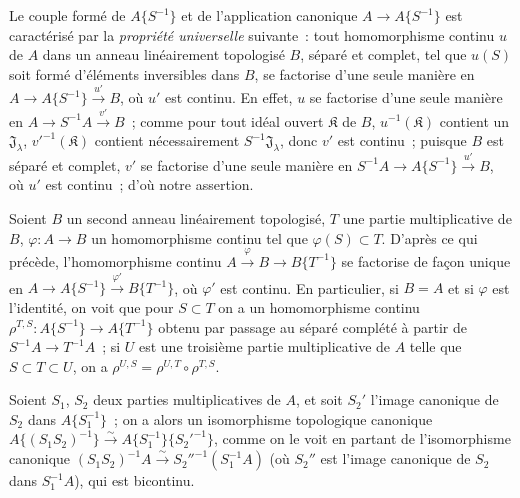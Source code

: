 \begin{env}[7.6.6]
\label{0.7.6.6-fr}
Le couple formé de $A\{S^{-1}\}$ et de l'application canonique
$A\to A\{S^{-1}\}$ est caractérisé par la \emph{propriété universelle}
suivante~: tout homomorphisme continu $u$ de $A$ dans un anneau linéairement
topologisé $B$, séparé et complet, tel que $u(S)$ soit formé d'éléments
inversibles dans $B$, se factorise d'une seule manière en
$A\to A\{S^{-1}\}\xrightarrow{u'}B$, où $u'$ est continu. En effet, $u$ se
factorise d'une seule manière en $A\to S^{-1}A\xrightarrow{v'}B$~; comme pour
tout idéal ouvert $\mathfrak K$ de $B$, $u^{-1}(\mathfrak K)$ contient un
$\mathfrak J_\lambda$, ${v'}^{-1}(\mathfrak K)$ contient nécessairement
$S^{-1}\mathfrak J_\lambda$, donc $v'$ est continu~; puisque $B$ est séparé et
complet, $v'$ se factorise d'une seule manière en
$S^{-1}A\to A\{S^{-1}\}\xrightarrow{u'}B$, où $u'$ est continu~; d'où notre
assertion.
\end{env}

\begin{env}[7.6.7]
\label{0.7.6.7-fr}
Soient $B$ un second anneau linéairement topologisé, $T$ une partie
multiplicative de $B$, $\varphi:A\to B$ un homomorphisme continu tel que
$\varphi(S)\subset T$. D'après ce qui précède, l'homomorphisme continu
$A\xrightarrow{\varphi}B\to B\{T^{-1}\}$ se factorise de façon unique en
$A\to A\{S^{-1}\}\xrightarrow{\varphi'}B\{T^{-1}\}$, où $\varphi'$ est
continu. En particulier, si $B=A$ et si $\varphi$ est l'identité, on voit que
pour $S\subset T$ on a un homomorphisme continu
$\rho^{T,S}:A\{S^{-1}\}\to A\{T^{-1}\}$ obtenu par passage au séparé complété
à partir de $S^{-1}A\to T^{-1}A$~; si $U$ est une troisième partie
multiplicative de $A$ telle que $S\subset T\subset U$, on a
$\rho^{U,S}=\rho^{U,T}\circ\rho^{T,S}$.
\end{env}

\begin{env}[7.6.8]
\label{0.7.6.8-fr}
Soient $S_1$, $S_2$ deux parties multiplicatives de $A$, et soit $S_2'$ l'image
canonique de $S_2$ dans $A\{S_1^{-1}\}$~; on a alors un isomorphisme
topologique canonique
$A\{(S_1S_2)^{-1}\}\xrightarrow{\sim}A\{S_1^{-1}\}\{{S_2'}^{-1}\}$,
comme on le voit en partant de l'isomorphisme canonique
$(S_1S_2)^{-1}A\xrightarrow{\sim}{S_2''}^{-1}(S_1^{-1}A)$ (où $S_2''$ est
l'image canonique de $S_2$ dans $S_1^{-1}A$), qui est bicontinu.
\end{env}

